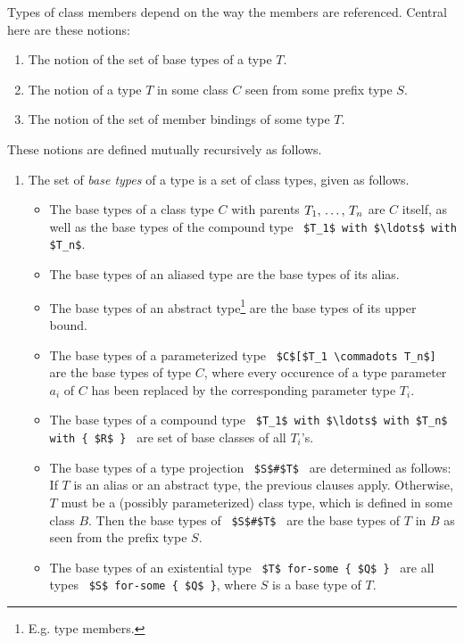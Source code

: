 Types of class members depend on the way the members are referenced. Central here are these notions:
\begin{enumerate}
\item The notion of the set of base types of a type $T$.
\item The notion of a type $T$ in some class $C$ seen from some prefix type $S$.
\item The notion of the set of member bindings of some type $T$. 
\end{enumerate}

These notions are defined mutually recursively as follows. 

\begin{enumerate}

\item
The set of {\em base types} of a type is a set of class types, given as follows.
\begin{itemize}
\item The base types of a class type $C$ with parents $T_1 ,\, \ldots ,\, T_n$ are $C$ itself, as well as the base types of the compound type ~\lstinline!$T_1$ with $\ldots$ with $T_n$!. 

\item The base types of an aliased type are the base types of its alias. 

\item The base types of an abstract type\footnote{E.g. type members.} are the base types of its upper bound. 

\item The base types of a parameterized type ~\lstinline!$C$[$T_1 \commadots T_n$]!~ are the base types of type $C$, where every occurence of a type parameter $a_i$ of $C$ has been replaced by the corresponding parameter type $T_i$. 

\item The base types of a compound type ~\lstinline!$T_1$ with $\ldots$ with $T_n$ with { $R$ }!~ are set of base classes of all $T_i$'s. 

\item The base types of a type projection ~\lstinline!$S$#$T$!~ are determined as follows: If $T$ is an alias or an abstract type, the previous clauses apply. Otherwise, $T$ must be a (possibly parameterized) class type, which is defined in some class $B$. Then the base types of ~\lstinline!$S$#$T$!~ are the base types of $T$ in $B$ as seen from the prefix type $S$. 

\item The base types of an existential type ~\lstinline!$T$ for-some { $Q$ }!~ are all types ~\lstinline!$S$ for-some { $Q$ }!, where $S$ is a base type of $T$. 
\end{itemize}


\end{enumerate}
